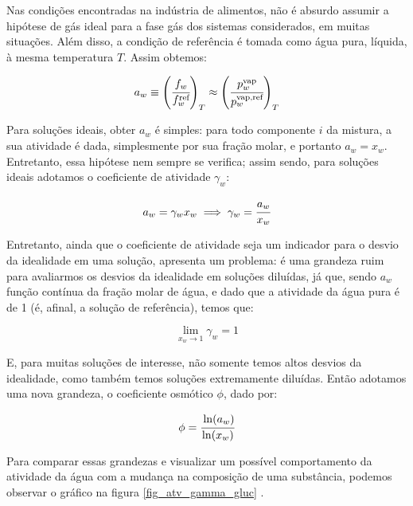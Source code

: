 \documentclass[
	12pt,				%
	openright,
	twoside,
	a4paper,			%
	english,			%
	french,				%
	spanish,			%
	brazil				%
	]{abntex2}
\begin{document}
Nas condições encontradas na indústria de alimentos, não é absurdo assumir a
hipótese de gás ideal para a fase gás dos sistemas
considerados\cite{canovas2007}, em muitas situações. Além disso, a condição de
referência é tomada como água pura, líquida, à mesma temperatura $T$. Assim
obtemos:

\begin{equation}
	\label{eq:def_atv}
	a_w \equiv \left(\cfrac{f_w}{f^\text{ref}_w}\right)_T%
		\approx \left(\cfrac{p^\text{vap}_w}{p^\text{vap,ref}_w}\right)_T
\end{equation}

Para soluções ideais, obter $a_w$ é simples: para todo componente $i$ da
mistura, a sua atividade é dada, simplesmente por sua fração molar, e portanto
$a_w = x_w$. Entretanto, essa hipótese nem sempre se verifica; assim sendo,
para soluções ideais adotamos o coeficiente de atividade $\gamma_w$:

\begin{equation}
	a_w = \gamma_wx_w \implies \gamma_w = \cfrac{a_w}{x_w}
\end{equation}

Entretanto, ainda que o coeficiente de atividade seja um indicador para o
desvio da idealidade em uma solução, apresenta um problema: é uma grandeza ruim
para avaliarmos os desvios da idealidade em soluções diluídas, já que, sendo
$a_w$ função contínua da fração molar de água, e dado que a atividade da água
pura é de 1 (é, afinal, a solução de referência), temos que:

\begin{equation}
	\lim_{x_w \to 1}\gamma_w = 1
\end{equation}

E, para muitas soluções de interesse, não somente temos altos desvios da
idealidade, como também temos soluções extremamente diluídas. Então adotamos
uma nova grandeza, o coeficiente osmótico $\phi$, dado por:

\begin{equation}
	\phi = \cfrac{\ln(a_w)}{\ln(x_w)}
\end{equation}

Para comparar essas grandezas e visualizar um possível comportamento da
atividade da água com a mudança na composição de uma substância, podemos
observar o gráfico na figura \ref{fig_atv_gamma_gluc} \cite{ebrahimi2016}.
\end{document}
